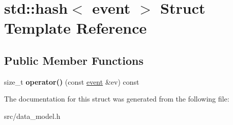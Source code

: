 \hypertarget{structstd_1_1hash_3_01event_01_4}{}\section{std\+:\+:hash$<$ event $>$ Struct Template Reference}
\label{structstd_1_1hash_3_01event_01_4}
\subsection*{Public Member Functions}
\begin{DoxyCompactItemize}
\item 
\mbox{\label{structstd_1_1hash_3_01event_01_4_a884f1c6eb055d6f5343f765881e5e766}} 
size\+\_\+t {\bfseries operator()} (const \hyperlink{structevent}{event} \&ev) const
\end{DoxyCompactItemize}


The documentation for this struct was generated from the following file\+:\begin{DoxyCompactItemize}
\item 
src/data\+\_\+model.\+h\end{DoxyCompactItemize}
